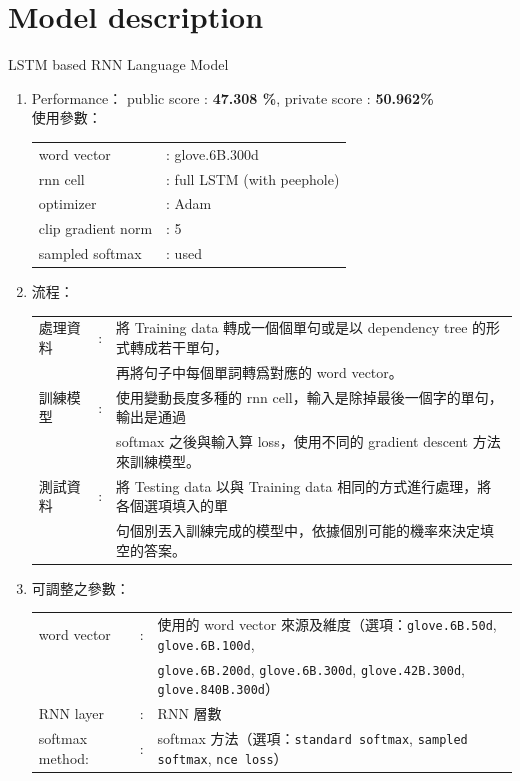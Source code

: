 \documentclass[12pt, a4paper]{article}
\theoremstyle{mystyle}	%
\begin{document}
\section{Model description}
LSTM based RNN Language Model
\begin{enumerate}
  \item Performance：
    public score : \textbf{47.308 \%}, private score : \textbf{50.962\%}\\
  使用參數：\\
  \begin{tabular}{ll}
    word vector     & : glove.6B.300d \\
    rnn cell        & : full LSTM (with peephole) \\
    optimizer       & : Adam  \\
    clip gradient norm & : 5 \\
    sampled softmax & : used \\
  \end{tabular}
  \item 流程：\\
    \begin{tabular}{lcl}
      處理資料 & : & 將 Training data 轉成一個個單句或是以 dependency tree 的形式轉成若干單句，\\
               &   & 再將句子中每個單詞轉爲對應的 word vector。 \\
      訓練模型 & : & 使用變動長度多種的 rnn cell，輸入是除掉最後一個字的單句，輸出是通過  \\
               &   & softmax 之後與輸入算 loss，使用不同的 gradient descent 方法來訓練模型。\\
      測試資料 & : & 將 Testing data 以與 Training data 相同的方式進行處理，將各個選項填入的單 \\
               &   & 句個別丟入訓練完成的模型中，依據個別可能的機率來決定填空的答案。\\
    \end{tabular}
  \item 可調整之參數：\\
    \begin{tabular}{lcl}
      word vector & : & 使用的 word vector 來源及維度（選項：\texttt{glove.6B.50d}, \texttt{glove.6B.100d}, \\
                &  & \texttt{glove.6B.200d}, \texttt{glove.6B.300d}, \texttt{glove.42B.300d}, \texttt{glove.840B.300d}）\\
      RNN layer & : & RNN 層數 \\
      softmax method: & : & softmax 方法（選項：\texttt{standard softmax}, \texttt{sampled softmax}, \texttt{nce loss}） \\

\end{tabular}
\end{enumerate}
\end{document}
